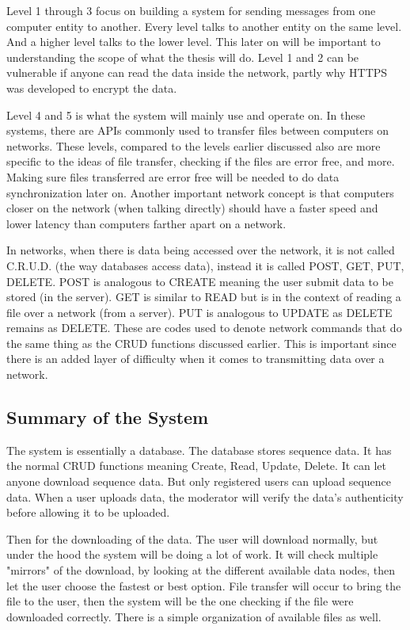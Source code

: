 \documentclass[acmsmall]{acmart}
\begin{document}
Level 1 through 3 focus on building a system for sending messages from one computer entity to another. Every level talks to another entity on the same level. And a higher level talks to the lower level. This later on will be important to understanding the scope of what the thesis will do. Level 1 and 2 can be vulnerable if anyone can read the data inside the network, partly why HTTPS was developed to encrypt the data. 

Level 4 and 5 is what the system will mainly use and operate on. In these systems, there are APIs commonly used to transfer files between computers on networks. These levels, compared to the levels earlier discussed also are more specific to the ideas of file transfer, checking if the files are error free, and more. Making sure files transferred are error free will be needed to do data synchronization later on. Another important network concept is that computers closer on the network (when talking directly) should have a faster speed and lower latency than computers farther apart on a network.

In networks, when there is data being accessed over the network, it is not called C.R.U.D. (the way databases access data), instead it is called POST, GET, PUT, DELETE. POST is analogous to CREATE meaning the user submit data to be stored (in the server). GET is similar to READ but is in the context of reading a file over a network (from a server). PUT is analogous to UPDATE as DELETE remains as DELETE. These are codes used to denote network commands that do the same thing as the CRUD functions discussed earlier. This is important since there is an added layer of difficulty when it comes to transmitting data over a network. 


\subsection{Summary of the System}

The system is essentially a database. The database stores sequence data. It has the normal CRUD functions meaning Create, Read, Update, Delete. It can let anyone download sequence data. But only registered users can upload sequence data. When a user uploads data, the moderator will verify the data's authenticity before allowing it to be uploaded. 

Then for the downloading of the data. The user will download normally, but under the hood the system will be doing a lot of work. It will check multiple "mirrors" of the download, by looking at the different available data nodes, then let the user choose the fastest or best option. File transfer will occur to bring the file to the user, then the system will be the one checking if the file were downloaded correctly. There is a simple organization of available files as well.
\end{document}
